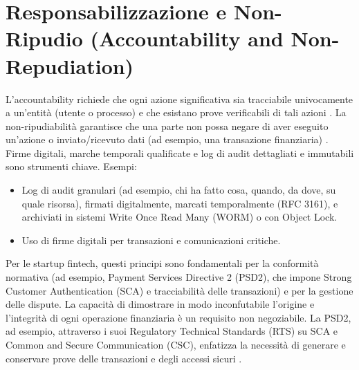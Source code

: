 \section{Responsabilizzazione e Non-Ripudio (Accountability and Non-Repudiation)}
L'accountability richiede che ogni azione significativa sia tracciabile univocamente a un'entità (utente o processo) e che esistano prove verificabili di tali azioni \cite{Feigenbaum_2020_Accountability}. La non-ripudiabilità garantisce che una parte non possa negare di aver eseguito un'azione o inviato/ricevuto dati (ad esempio, una transazione finanziaria) \cite{NIST_Glossary_NonRepudiation}. Firme digitali, marche temporali qualificate e log di audit dettagliati e immutabili sono strumenti chiave.
Esempi:
\begin{itemize}
\item Log di audit granulari (ad esempio, chi ha fatto cosa, quando, da dove, su quale risorsa), firmati digitalmente, marcati temporalmente (RFC 3161), e archiviati in sistemi Write Once Read Many (WORM) o con Object Lock.
\item Uso di firme digitali per transazioni e comunicazioni critiche.
\end{itemize}
Per le startup fintech, questi principi sono fondamentali per la conformità normativa (ad esempio, Payment Services Directive 2 (PSD2), che impone Strong Customer Authentication (SCA) e tracciabilità delle transazioni) e per la gestione delle dispute. La capacità di dimostrare in modo inconfutabile l'origine e l'integrità di ogni operazione finanziaria è un requisito non negoziabile. La PSD2, ad esempio, attraverso i suoi Regulatory Technical Standards (RTS) su SCA e Common and Secure Communication (CSC), enfatizza la necessità di generare e conservare prove delle transazioni e degli accessi sicuri \cite{EBA_RTS_SCA_CSC}.

